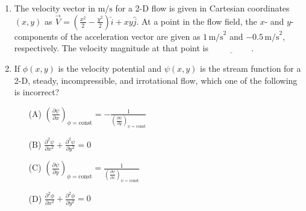 \documentclass[journal,12pt,onecolumn]{IEEEtran}
\theoremstyle{remark}
\begin{document}
\begin{enumerate}
    \item The velocity vector in $\text{m/s}$ for a 2-D flow is given in Cartesian coordinates $(x, y)$ as $\vec{V} = \left( \frac{x^2}{2} - \frac{y^2}{2} \right) \hat{i} + xy \hat{j}$. At a point in the flow field, the $x$- and $y$-components of the acceleration vector are given as $1 \, \text{m/s}^2$ and $-0.5 \, \text{m/s}^2$, respectively. The velocity magnitude at that point is $\underline{\hspace{2cm}}$.
\item  If $\phi(x, y)$ is the velocity potential and $\psi(x, y)$ is the stream function for a 2-D, steady, incompressible, and irrotational flow, which one of the following is incorrect?
\begin{enumerate}
    \item[(A)] $\left( \frac{\partial \psi}{\partial x} \right)_{\phi= \text{const}}  = -\frac{1}{\left( \frac{\partial \psi}{\partial y} \right)_{\psi= \text{const}}}$
    \item[(B)] $\frac{\partial^2 \psi}{\partial x^2} + \frac{\partial^2 \psi}{\partial y^2} = 0$
    \item[(C)] $\left( \frac{\partial \psi}{\partial y} \right)_{\phi= \text{const}} =  \frac{1}{\left( \frac{\partial \psi}{\partial x} \right)_{\psi= \text{const}}}$
    \item[(D)] $\frac{\partial^2 \phi}{\partial x^2} + \frac{\partial^2 \phi}{\partial y^2} = 0$
\end{enumerate}


\end{enumerate}
\end{document}
